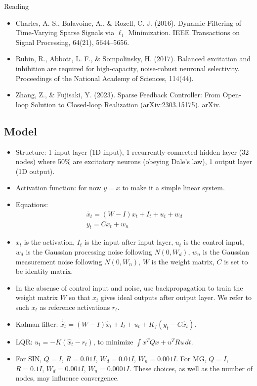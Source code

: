 \documentclass[12pt, a4paper]{article}
\begin{document}
\noindent
Reading

\begin{itemize}
    \item Charles, A. S., Balavoine, A., \& Rozell, C. J. (2016). Dynamic Filtering of Time-Varying Sparse Signals via $\ell _1$ Minimization. IEEE Transactions on Signal Processing, 64(21), 5644–5656.
    \item Rubin, R., Abbott, L. F., \& Sompolinsky, H. (2017). Balanced excitation and inhibition are required for high-capacity, noise-robust neuronal selectivity. Proceedings of the National Academy of Sciences, 114(44).
    \item Zhang, Z., \& Fujisaki, Y. (2023). Sparse Feedback Controller: From Open-loop Solution to Closed-loop Realization (arXiv:2303.15175). arXiv.
\end{itemize}

\newpage

\subsection*{Model}
\begin{itemize}
    \item Structure: 1 input layer (1D input), 1 recurrently-connected hidden layer (32 nodes) where 50\% are excitatory neurons (obeying Dale's law), 1 output layer (1D output). 

    \item Activation function: for now $y=x$ to make it a simple linear system.
    
    \item Equations: 
    \begin{eqnarray}
    \nonumber
    \dot{x_t} = (W-I)x_t + I_{t} + u_{t} + w_d \\
    \nonumber
    y_t = Cx_{t} + w_n
    \end{eqnarray}
    
    \item $x_t$ is the activation, $I_t$ is the input after input layer, $u_t$ is the control input, $w_d$ is the Gaussian processing noise following $N(0,W_d)$, $w_n$ is the Gaussian measurement noise following $N(0,W_n)$, $W$ is the weight matrix, $C$ is set to be identity matrix.

    \item In the absense of control input and noise, use backpropagation to train the weight matrix $W$ so that $x_t$ gives ideal outputs after output layer. We refer to such $x_t$ as reference activations $r_t$.

    \item Kalman filter: $\dot{\hat{x}_t} = (W-I)\hat{x}_t + I_{t} + u_{t} + K_f(y_t - C\hat{x}_t)$.
    
    \item LQR: $u_t = -K(\hat{x}_t - r_t)$, to minimize $\int x^TQx + u^TRu \,dt$.

    \item For SIN, $Q = I$, $R = 0.01I$, $W_d = 0.01I$, $W_n = 0.001I$. For MG, $Q = I$, $R = 0.1I$, $W_d = 0.001I$, $W_n = 0.0001I$. These choices, as well as the number of nodes, may influence convergence.

\end{itemize}
\end{document}
